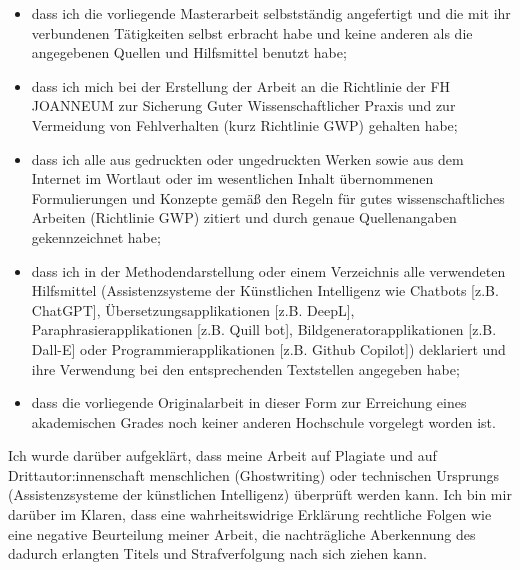 {\begin{itemize}
    \item dass ich die vorliegende Masterarbeit selbstständig angefertigt und die mit ihr verbundenen Tätigkeiten selbst erbracht habe und keine anderen als die angegebenen Quellen und Hilfsmittel benutzt habe;
    \item dass ich mich bei der Erstellung der Arbeit an die Richtlinie der FH JOANNEUM zur Sicherung Guter Wissenschaftlicher Praxis und zur Vermeidung von Fehlverhalten (kurz Richtlinie GWP) gehalten habe;
    \item dass ich alle aus gedruckten oder ungedruckten Werken sowie aus dem Internet im Wortlaut oder im wesentlichen Inhalt übernommenen Formulierungen und Konzepte gemäß den Regeln für gutes wissenschaftliches Arbeiten (Richtlinie GWP) zitiert und durch genaue Quellenangaben gekennzeichnet habe;
    \item dass ich in der Methodendarstellung oder einem Verzeichnis alle verwendeten Hilfsmittel (Assistenzsysteme der Künstlichen Intelligenz wie Chatbots [z.B. ChatGPT], Übersetzungsapplikationen [z.B. DeepL], Paraphrasierapplikationen [z.B. Quill bot], Bildgeneratorapplikationen [z.B. Dall-E] oder Programmierapplikationen [z.B. Github Copilot]) deklariert und ihre Verwendung bei den entsprechenden Textstellen angegeben habe;
    \item dass die vorliegende Originalarbeit in dieser Form zur Erreichung eines akademischen Grades noch keiner anderen Hochschule vorgelegt worden ist.
\end{itemize}

Ich wurde darüber aufgeklärt, dass meine Arbeit auf Plagiate und auf Drittautor:innenschaft menschlichen (Ghostwriting) oder technischen Ursprungs (Assistenzsysteme der künstlichen Intelligenz) überprüft werden kann. Ich bin mir darüber im Klaren, dass eine wahrheitswidrige Erklärung rechtliche Folgen wie eine negative Beurteilung meiner Arbeit, die nachträgliche Aberkennung des dadurch erlangten Titels und Strafverfolgung nach sich ziehen kann.

}